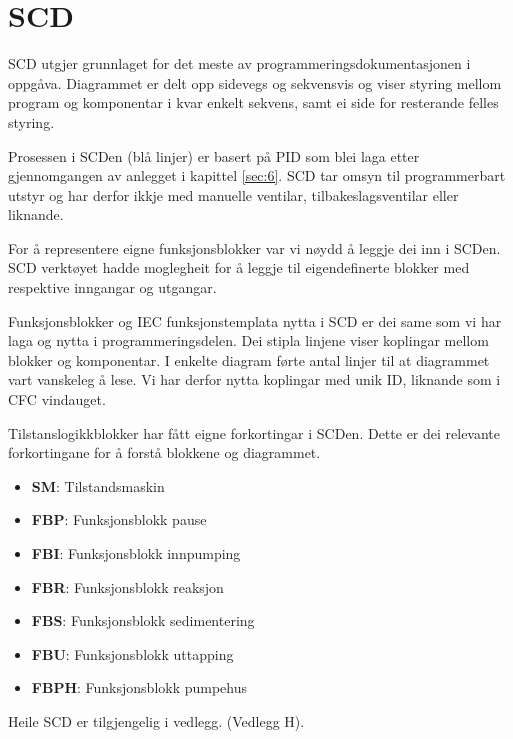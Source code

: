\newpage
\section{SCD}
\thispagestyle{fancy}

\gls{SCD} utgjer grunnlaget for det meste av programmeringsdokumentasjonen i oppgåva.
Diagrammet er delt opp sidevegs og sekvensvis og viser styring mellom program og komponentar i kvar enkelt sekvens,
samt ei side for resterande felles styring.

Prosessen i \gls{SCD}en (blå linjer) er basert på \gls{PID} som blei laga etter gjennomgangen av anlegget i kapittel \ref{sec:6}.
\gls{SCD} tar omsyn til programmerbart utstyr og har derfor ikkje med manuelle ventilar, tilbakeslagsventilar eller liknande.

For å representere eigne funksjonsblokker var vi nøydd å leggje dei inn i \gls{SCD}en.
\gls{SCD} verktøyet hadde moglegheit for å leggje til eigendefinerte blokker med respektive inngangar og utgangar.

Funksjonsblokker og \gls{IEC} funksjonstemplata nytta i \gls{SCD} er dei same som vi har laga og nytta i programmeringsdelen. 
Dei stipla linjene viser koplingar mellom blokker og komponentar. \newline
I enkelte diagram førte antal linjer til at diagrammet vart vanskeleg å lese. 
Vi har derfor nytta koplingar med unik ID, liknande som i CFC vindauget.

Tilstanslogikkblokker har fått eigne forkortingar i \gls{SCD}en.
Dette er dei relevante forkortingane for å forstå blokkene og diagrammet.

\begin{itemize}
    \item \textbf{SM}:   Tilstandsmaskin
    \item \textbf{FBP}:  Funksjonsblokk pause
    \item \textbf{FBI}:  Funksjonsblokk innpumping
    \item \textbf{FBR}:  Funksjonsblokk reaksjon
    \item \textbf{FBS}:  Funksjonsblokk sedimentering
    \item \textbf{FBU}:  Funksjonsblokk uttapping
    \item \textbf{FBPH}: Funksjonsblokk pumpehus
\end{itemize}

Heile \gls{SCD} er tilgjengelig i vedlegg. (Vedlegg H). \newline
\newpage

